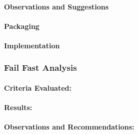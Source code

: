 \documentclass{article}
\begin{document}
\paragraph{Observations and Suggestions}

\paragraph{Packaging}

\paragraph{Implementation}

\subsubsection{Fail Fast Analysis}

\paragraph{Criteria Evaluated:}

\paragraph{Results:}

\paragraph{Observations and Recommendations:}
\end{document}
